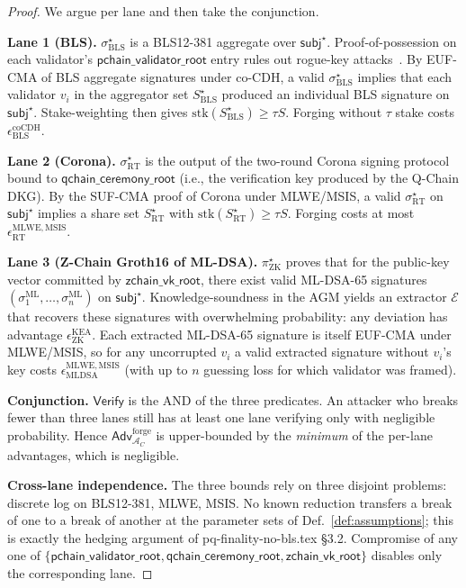 \documentclass[11pt]{article}
\begin{document}
\begin{proof}
We argue per lane and then take the conjunction.

\medskip\noindent
\textbf{Lane 1 (BLS).}  $\sigma_{\mathrm{BLS}}^\star$ is a BLS12-381
aggregate over $\mathsf{subj}^\star$.  Proof-of-possession on each
validator's $\mathsf{pchain\_validator\_root}$ entry rules out
rogue-key attacks~\cite{boneh2001short}.  By EUF-CMA of BLS aggregate
signatures under co-CDH, a valid $\sigma_{\mathrm{BLS}}^\star$ implies
that each validator $v_i$ in the aggregator set
$S_{\mathrm{BLS}}^\star$ produced an individual BLS signature on
$\mathsf{subj}^\star$.  Stake-weighting then gives
$\mathrm{stk}(S_{\mathrm{BLS}}^\star) \geq \tau S$.  Forging without
$\tau$ stake costs $\epsilon_{\mathrm{BLS}}^{\mathrm{coCDH}}$.

\medskip\noindent
\textbf{Lane 2 (Corona).}  $\sigma_{\mathrm{RT}}^\star$ is the
output of the two-round Corona signing protocol bound to
$\mathsf{qchain\_ceremony\_root}$ (i.e., the verification key produced
by the Q-Chain DKG).  By the SUF-CMA proof of Corona under MLWE/MSIS,
a valid $\sigma_{\mathrm{RT}}^\star$ on $\mathsf{subj}^\star$ implies a
share set $S_{\mathrm{RT}}^\star$ with
$\mathrm{stk}(S_{\mathrm{RT}}^\star) \geq \tau S$.  Forging costs at
most $\epsilon_{\mathrm{RT}}^{\mathrm{MLWE,MSIS}}$.

\medskip\noindent
\textbf{Lane 3 (Z-Chain Groth16 of ML-DSA).}  $\pi_{\mathrm{ZK}}^\star$
proves that for the public-key vector committed by
$\mathsf{zchain\_vk\_root}$, there exist valid ML-DSA-65 signatures
$(\sigma_1^{\mathrm{ML}}, \ldots, \sigma_n^{\mathrm{ML}})$ on
$\mathsf{subj}^\star$.  Knowledge-soundness in the AGM yields an
extractor $\mathcal{E}$ that recovers these signatures with
overwhelming probability: any deviation has advantage
$\epsilon_{\mathrm{ZK}}^{\mathrm{KEA}}$.  Each extracted ML-DSA-65
signature is itself EUF-CMA under MLWE/MSIS, so for any uncorrupted
$v_i$ a valid extracted signature without $v_i$'s key costs
$\epsilon_{\mathrm{MLDSA}}^{\mathrm{MLWE,MSIS}}$ (with up to $n$ guessing
loss for which validator was framed).

\medskip\noindent
\textbf{Conjunction.}  $\mathsf{Verify}$ is the AND of the three
predicates.  An attacker who breaks fewer than three lanes still has
at least one lane verifying only with negligible probability.  Hence
$\mathsf{Adv}^{\mathrm{forge}}_{\mathcal{A}_C}$ is upper-bounded by the
\emph{minimum} of the per-lane advantages, which is negligible.

\medskip\noindent
\textbf{Cross-lane independence.}  The three bounds rely on three
disjoint problems: discrete log on BLS12-381, MLWE, MSIS.  No known
reduction transfers a break of one to a break of another at the
parameter sets of Def.~\ref{def:assumptions}; this is exactly the
hedging argument of pq-finality-no-bls.tex \S3.2.  Compromise of any
one of $\{\mathsf{pchain\_validator\_root}, \mathsf{qchain\_ceremony\_root},
\mathsf{zchain\_vk\_root}\}$ disables only the corresponding lane.
\end{proof}
\end{document}
